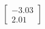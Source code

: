 \documentclass[preview]{standalone}
\begin{document}
\begin{align*}
\begin{bmatrix} -3.03 \\ 2.01 \end{bmatrix}
\end{align*}
\end{document}
